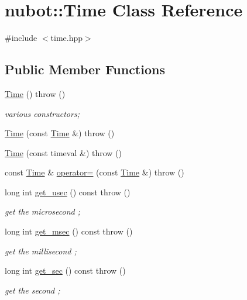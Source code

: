 \hypertarget{classnubot_1_1Time}{\section{nubot\-:\-:Time Class Reference}
\label{classnubot_1_1Time}
}


{\ttfamily \#include $<$time.\-hpp$>$}

\subsection*{Public Member Functions}
\begin{DoxyCompactItemize}
\item 
\hyperlink{classnubot_1_1Time_a07a2c5b5f50e5c39040607dffdca8cf2}{Time} ()  throw ()
\begin{DoxyCompactList}\small\item\em various constructors; \end{DoxyCompactList}\item 
\hyperlink{classnubot_1_1Time_a87fe1767a6370743c81d231657fa4870}{Time} (const \hyperlink{classnubot_1_1Time}{Time} \&)  throw ()
\item 
\hyperlink{classnubot_1_1Time_a3a4bed39dc118c114affb9f362688493}{Time} (const timeval \&)  throw ()
\item 
const \hyperlink{classnubot_1_1Time}{Time} \& \hyperlink{classnubot_1_1Time_aea48b98944334733eda2ed3b794174c6}{operator=} (const \hyperlink{classnubot_1_1Time}{Time} \&)  throw ()
\item 
long int \hyperlink{classnubot_1_1Time_a4f721a09b093abfa55692dbb24183d7b}{get\-\_\-usec} () const   throw ()
\begin{DoxyCompactList}\small\item\em get the microsecond ; \end{DoxyCompactList}\item 
long int \hyperlink{classnubot_1_1Time_ab10504cd0ac88562f55f12b9821eac3c}{get\-\_\-msec} () const   throw ()
\begin{DoxyCompactList}\small\item\em get the millisecond ; \end{DoxyCompactList}\item 
long int \hyperlink{classnubot_1_1Time_a6720ffaa75761d96fe911789a24ee1d3}{get\-\_\-sec} () const   throw ()
\begin{DoxyCompactList}\small\item\em get the second ; \end{DoxyCompactList}\item 

\end{DoxyCompactItemize}

